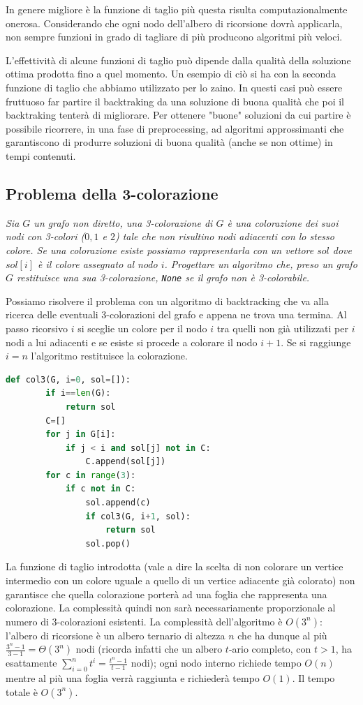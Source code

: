 In genere migliore è la funzione di taglio più questa risulta computazionalmente onerosa. Considerando che ogni nodo dell'albero di ricorsione dovrà applicarla, non sempre funzioni in grado di tagliare di più producono algoritmi più veloci.

L'effettività di alcune funzioni di taglio può dipende dalla qualità della soluzione ottima prodotta fino a quel momento. Un esempio di ciò si ha con la seconda funzione di taglio che abbiamo utilizzato per lo zaino.
In questi casi può essere fruttuoso far partire il backtraking da una soluzione di buona qualità che poi il backtraking tenterà di migliorare.
Per ottenere "buone" soluzioni da cui partire è possibile ricorrere, in una fase di preprocessing, ad algoritmi approssimanti che garantiscono di produrre soluzioni di buona qualità (anche se non ottime) in tempi contenuti.

\subsection{Problema della 3-colorazione}
\textit{Sia $G$ un grafo non diretto, una 3-colorazione di $G$ è una colorazione dei suoi nodi con 3-colori ($0, 1$ e $2$) tale che non risultino nodi adiacenti con lo stesso colore. Se una colorazione esiste possiamo rappresentarla con un vettore $sol$ dove $sol[i]$ è il colore assegnato al nodo $i$. Progettare un algoritmo che, preso un grafo $G$ restituisce una sua 3-colorazione, \texttt{None} se il grafo non è 3-colorabile.}

Possiamo risolvere il problema con un algoritmo di backtracking che va alla ricerca delle eventuali 3-colorazioni del grafo e appena ne trova una termina. Al passo ricorsivo $i$ si sceglie un colore per il nodo $i$ tra quelli non già utilizzati per $i$ nodi a lui adiacenti e se esiste si procede a colorare il nodo $i + 1$. Se si raggiunge $i=n$ l'algoritmo restituisce la colorazione.

\begin{lstlisting}[language=Python]
    def col3(G, i=0, sol=[]):
        if i==len(G):
            return sol
        C=[]
        for j in G[i]:
            if j < i and sol[j] not in C:
                C.append(sol[j])
        for c in range(3):
            if c not in C:
                sol.append(c)
                if col3(G, i+1, sol):
                    return sol    
                sol.pop()
\end{lstlisting}

La funzione di taglio introdotta (vale a dire la scelta di non colorare un vertice intermedio con un colore uguale a quello di un vertice adiacente già colorato) non garantisce che quella colorazione porterà ad una foglia che rappresenta una colorazione. La complessità quindi non sarà necessariamente proporzionale al numero di 3-colorazioni esistenti. La complessità dell’algoritmo è $O(3^n)$: l’albero di ricorsione è un albero ternario di altezza $n$ che ha dunque al più $\frac{3^n-1}{3-1}=\Theta(3^n)$ nodi (ricorda infatti che un albero $t$-ario completo, con $t > 1$, ha esattamente $\sum^n_{i=0}t^i=\frac{t^n-1}{t-1}$ nodi); ogni nodo interno richiede tempo $O(n)$ mentre al più una foglia verrà raggiunta e richiederà tempo $O(1)$. Il tempo totale è $O(3^n)$.

